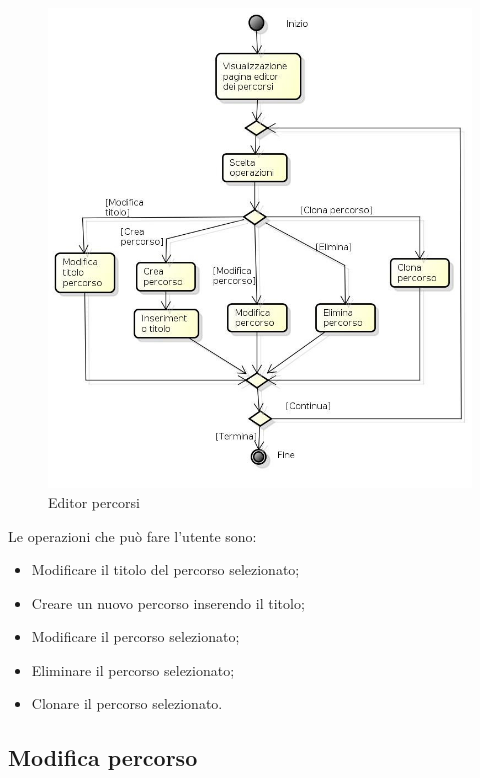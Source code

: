 \begin{figure}[h!]
		\centering
		\includegraphics[scale=.2]{img/Editor_percorsi.jpg}
		\caption{Editor percorsi}
		\label{fig:ModelloSpy}
\end{figure}

Le operazioni che può fare l'utente sono:
\begin{itemize}
\item Modificare il titolo del percorso selezionato;
\item Creare un nuovo percorso inserendo il titolo;
\item Modificare il percorso selezionato;
\item Eliminare il percorso selezionato; 
\item Clonare il percorso selezionato.
\end{itemize}

\subsection{Modifica percorso}

